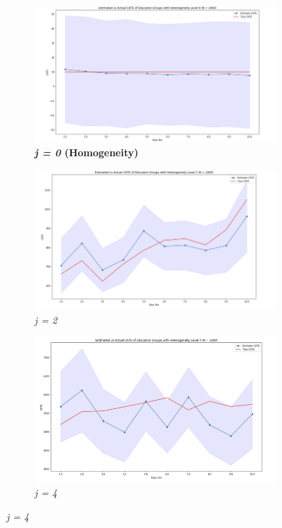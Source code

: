 \documentclass[12pt]{article}
\begin{document}
\begin{figure}[!htp]
\caption{\label{figure:seven}CATE Estimates by Variation in Degrees of Heterogeneity}
	\centering
	\begin{subfigure} [h] {0.49\linewidth}
		\caption{\textbf{\textit{j = 0} (Homogeneity)}}
   	 	\includegraphics[width = \linewidth]{Graphs/s2_CATEhet0.png}
	\end{subfigure}
	\begin{subfigure} [h] {0.49\linewidth}
		\caption{\textit{j = 2}}
   	 	\includegraphics[width = \linewidth]{Graphs/s2_CATEhet2.png}
	\end{subfigure}
	\begin{subfigure} [h] {0.49\linewidth}
	\vspace{0.5cm}
		\caption{\textit{j = 4}}
   	 	\includegraphics[width = \linewidth]{Graphs/s2_CATEhet4.png}

\end{subfigure}
\end{figure}
\end{document}
